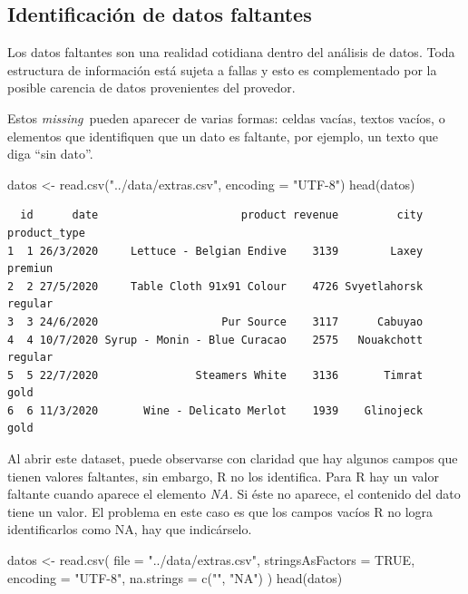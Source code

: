 \documentclass[
  letterpaper,
  DIV=11,
  numbers=noendperiod]{scrreprt}
\newenvironment{Shaded}{\begin{snugshade}}{\end{snugshade}}
\newcommand{\AttributeTok}[1]{\textcolor[rgb]{0.40,0.45,0.13}{#1}}
\newcommand{\ConstantTok}[1]{\textcolor[rgb]{0.56,0.35,0.01}{#1}}
\newcommand{\FunctionTok}[1]{\textcolor[rgb]{0.28,0.35,0.67}{#1}}
\newcommand{\NormalTok}[1]{\textcolor[rgb]{0.00,0.23,0.31}{#1}}
\newcommand{\OtherTok}[1]{\textcolor[rgb]{0.00,0.23,0.31}{#1}}
\newcommand{\StringTok}[1]{\textcolor[rgb]{0.13,0.47,0.30}{#1}}
\begin{document}
\hypertarget{identificaciuxf3n-de-datos-faltantes}{%
\subsection{Identificación de datos
faltantes}\label{identificaciuxf3n-de-datos-faltantes}}

Los datos faltantes son una realidad cotidiana dentro del análisis de
datos. Toda estructura de información está sujeta a fallas y esto es
complementado por la posible carencia de datos provenientes del
provedor.

Estos \emph{missing}~pueden aparecer de varias formas: celdas vacías,
textos vacíos, o elementos que identifiquen que un dato es faltante, por
ejemplo, un texto que diga ``sin dato''.

\begin{Shaded}
\begin{Highlighting}[]
\NormalTok{datos }\OtherTok{\textless{}{-}} \FunctionTok{read.csv}\NormalTok{(}\StringTok{"../data/extras.csv"}\NormalTok{, }\AttributeTok{encoding =} \StringTok{"UTF{-}8"}\NormalTok{)}
\FunctionTok{head}\NormalTok{(datos)}
\end{Highlighting}
\end{Shaded}

\begin{verbatim}
  id      date                      product revenue         city product_type
1  1 26/3/2020     Lettuce - Belgian Endive    3139        Laxey      premiun
2  2 27/5/2020     Table Cloth 91x91 Colour    4726 Svyetlahorsk      regular
3  3 24/6/2020                   Pur Source    3117      Cabuyao             
4  4 10/7/2020 Syrup - Monin - Blue Curacao    2575   Nouakchott      regular
5  5 22/7/2020               Steamers White    3136       Timrat         gold
6  6 11/3/2020       Wine - Delicato Merlot    1939    Glinojeck         gold
\end{verbatim}

Al abrir este dataset, puede observarse con claridad que hay algunos
campos que tienen valores faltantes, sin embargo, R no los identifica.
Para R hay un valor faltante cuando aparece el elemento \emph{NA.} Si
éste no aparece, el contenido del dato tiene un valor. El problema en
este caso es que los campos vacíos R no logra identificarlos como NA,
hay que indicárselo.

\begin{Shaded}
\begin{Highlighting}[]
\NormalTok{datos }\OtherTok{\textless{}{-}} \FunctionTok{read.csv}\NormalTok{(}
  \AttributeTok{file =} \StringTok{"../data/extras.csv"}\NormalTok{, }
  \AttributeTok{stringsAsFactors =} \ConstantTok{TRUE}\NormalTok{, }
  \AttributeTok{encoding =} \StringTok{"UTF{-}8"}\NormalTok{, }
  \AttributeTok{na.strings =} \FunctionTok{c}\NormalTok{(}\StringTok{""}\NormalTok{, }\StringTok{"NA"}\NormalTok{)}
\NormalTok{)}
\FunctionTok{head}\NormalTok{(datos)}
\end{Highlighting}
\end{Shaded}
\end{document}
